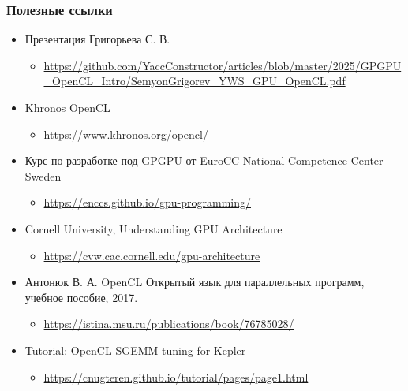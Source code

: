 \documentclass[
    aspectratio=169,
]{beamer}
\begin{document}

\begin{frame}
    \frametitle{Полезные ссылки}

    \begin{itemize}
        \item Презентация Григорьева С. В.
              \begin{itemize}
                  \item \scriptsize{\url{https://github.com/YaccConstructor/articles/blob/master/2025/GPGPU_OpenCL_Intro/SemyonGrigorev_YWS_GPU_OpenCL.pdf}}
              \end{itemize}
        \item {Khronos OpenCL}
              \begin{itemize}
                  \item \scriptsize{\url{https://www.khronos.org/opencl/}}
              \end{itemize}
        \item {Курс по разработке под GPGPU от EuroCC National Competence Center Sweden}
              \begin{itemize}
                  \item \scriptsize{\url{https://enccs.github.io/gpu-programming/}}
              \end{itemize}
        \item {Cornell University, Understanding GPU Architecture}
              \begin{itemize}
                  \item \scriptsize{\url{https://cvw.cac.cornell.edu/gpu-architecture}}
              \end{itemize}
        \item {Антонюк В. А. OpenCL Открытый язык для параллельных программ, учебное пособие, 2017.}
              \begin{itemize}
                  \item \scriptsize{\url{https://istina.msu.ru/publications/book/76785028/}}
              \end{itemize}
        \item Tutorial: OpenCL SGEMM tuning for Kepler
              \begin{itemize}
                  \item \url{https://cnugteren.github.io/tutorial/pages/page1.html}
              \end{itemize}
    \end{itemize}

\end{frame}
\end{document}
